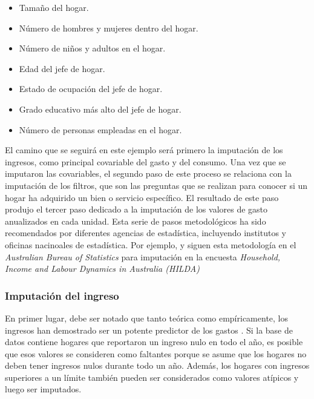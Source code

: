 \documentclass[12pt,spanish,]{book}
\providecommand{\tightlist}{%
  \setlength{\itemsep}{0pt}\setlength{\parskip}{0pt}}
\begin{document}
\begin{itemize}
\tightlist
\item
  Tamaño del hogar.
\item
  Número de hombres y mujeres dentro del hogar.
\item
  Número de niños y adultos en el hogar.
\item
  Edad del jefe de hogar.
\item
  Estado de ocupación del jefe de hogar.
\item
  Grado educativo más alto del jefe de hogar.
\item
  Número de personas empleadas en el hogar.
\end{itemize}

El camino que se seguirá en este ejemplo será primero la imputación de los ingresos, como principal covariable del gasto y del consumo. Una vez que se imputaron las covariables, el segundo paso de este proceso se relaciona con la imputación de los filtros, que son las preguntas que se realizan para conocer si un hogar ha adquirido un bien o servicio específico. El resultado de este paso produjo el tercer paso dedicado a la imputación de los valores de gasto anualizados en cada unidad. Esta serie de pasos metodológicos ha sido recomendados por diferentes agencias de estadística, incluyendo institutos y oficinas nacinoales de estadística. Por ejemplo, \textcite{Hayes_Watson_2009} y \textcite{Sun_2010} siguen esta metodología en el \emph{Australian Bureau of Statistics} para imputación en la encuesta \emph{Household, Income and Labour Dynamics in Australia (HILDA)}

\hypertarget{imputacion-del-ingreso}{%
\subsubsection*{Imputación del ingreso}\label{imputacion-del-ingreso}}

En primer lugar, debe ser notado que tanto teórica como empíricamente, los ingresos han demostrado ser un potente predictor de los gastos \autocite{Starick_Watson_2011}. Si la base de datos contiene hogares que reportaron un ingreso nulo en todo el año, es posible que esos valores se consideren como faltantes porque se asume que los hogares no deben tener ingresos nulos durante todo un año. Además, los hogares con ingresos superiores a un límite también pueden ser considerados como valores atípicos y luego ser imputados.
\end{document}
